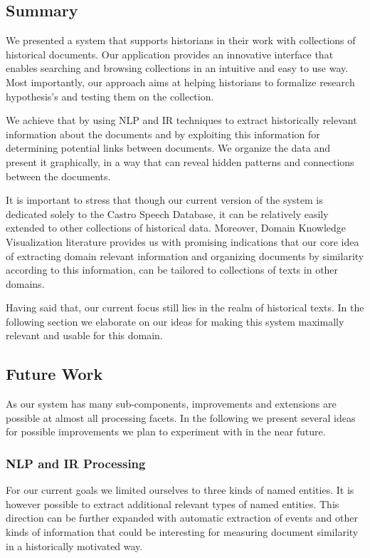 \subsection {Summary}
\label{sec:summary}

We presented a system that supports historians in their work with collections of historical documents. 
Our application provides an innovative interface that enables searching and browsing collections in an intuitive and easy to use way.
Most importantly, our approach aims at helping historians to formalize research hypothesis's and testing them on the collection.

We achieve that by using NLP and IR techniques to extract historically relevant information about the documents and by exploiting
this information for determining potential links between documents. We organize the data and present it graphically,
in a way that can reveal hidden patterns and connections between the documents.
 
It is important to stress that though our current version of the system is dedicated solely to the Castro Speech Database, 
it can be relatively easily extended to other collections of historical data. Moreover, Domain Knowledge Visualization literature
provides us with promising indications that our core idea of extracting domain relevant information and organizing documents by similarity 
according to this information, can be tailored to collections of texts in other domains. 

Having said that, our current focus still lies in the realm of historical texts. In the following section we elaborate on
our ideas for making this system maximally relevant and usable for this domain. 
 

\subsection {Future Work}
\label{sec:future_work}
As our system has many sub-components, improvements and extensions are possible
at almost all processing facets. In the following we present several ideas for possible improvements we plan to experiment with in the
near future.

\subsubsection{NLP and IR Processing}
For our current goals we limited ourselves to three kinds of named entities. 
It is however possible to extract additional relevant types of named entities. 
This direction can be further expanded with automatic extraction of events and other kinds of information that could be interesting for measuring 
document similarity in a historically motivated way.  

